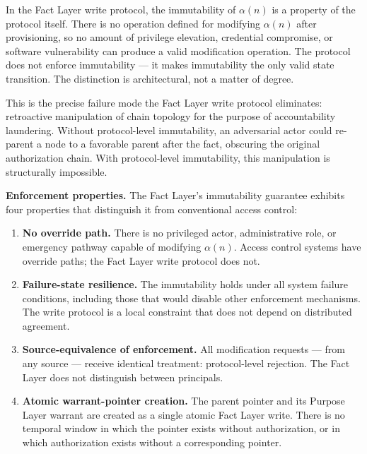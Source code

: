 In the Fact Layer write protocol, the immutability of $\alpha(n)$ is a property of the protocol itself. There is no operation defined for modifying $\alpha(n)$ after provisioning, so no amount of privilege elevation, credential compromise, or software vulnerability can produce a valid modification operation. The protocol does not enforce immutability --- it makes immutability the only valid state transition. The distinction is architectural, not a matter of degree.

This is the precise failure mode the Fact Layer write protocol eliminates: retroactive manipulation of chain topology for the purpose of accountability laundering. Without protocol-level immutability, an adversarial actor could re-parent a node to a favorable parent after the fact, obscuring the original authorization chain. With protocol-level immutability, this manipulation is structurally impossible.

\medskip
\noindent\textbf{Enforcement properties.} The Fact Layer's immutability guarantee exhibits four properties that distinguish it from conventional access control:

\begin{enumerate}
    \item[(E1)] \textbf{No override path.} There is no privileged actor, administrative role, or emergency pathway capable of modifying $\alpha(n)$. Access control systems have override paths; the Fact Layer write protocol does not.

    \item[(E2)] \textbf{Failure-state resilience.} The immutability holds under all system failure conditions, including those that would disable other enforcement mechanisms. The write protocol is a local constraint that does not depend on distributed agreement.

    \item[(E3)] \textbf{Source-equivalence of enforcement.} All modification requests --- from any source --- receive identical treatment: protocol-level rejection. The Fact Layer does not distinguish between principals.

    \item[(E4)] \textbf{Atomic warrant-pointer creation.} The parent pointer and its Purpose Layer warrant are created as a single atomic Fact Layer write. There is no temporal window in which the pointer exists without authorization, or in which authorization exists without a corresponding pointer.
\end{enumerate}

